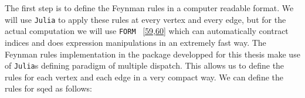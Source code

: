 \documentclass[
  11pt,
  a4paper,
  DIV=11,
  numbers=noendperiod,
  twoside]{scrreprt}
\newenvironment{Shaded}{\begin{snugshade}}{\end{snugshade}}
\newcommand{\DataTypeTok}[1]{\textcolor[rgb]{0.68,0.00,0.00}{#1}}
\newcommand{\FunctionTok}[1]{\textcolor[rgb]{0.28,0.35,0.67}{#1}}
\newcommand{\KeywordTok}[1]{\textcolor[rgb]{0.00,0.23,0.31}{#1}}
\newcommand{\NormalTok}[1]{\textcolor[rgb]{0.00,0.23,0.31}{#1}}
\newcommand{\OperatorTok}[1]{\textcolor[rgb]{0.37,0.37,0.37}{#1}}
\newcommand{\PreprocessorTok}[1]{\textcolor[rgb]{0.68,0.00,0.00}{#1}}
\newcommand{\SpecialCharTok}[1]{\textcolor[rgb]{0.37,0.37,0.37}{#1}}
\newcommand{\StringTok}[1]{\textcolor[rgb]{0.13,0.47,0.30}{#1}}
\DeclareRobustCommand{\[}{\begin{equation}}
\DeclareRobustCommand{\]}{\end{equation}}
\begin{document}
The first step is to define the Feynman rules in a computer readable
format. We will use \texttt{Julia} to apply these rules at every vertex
and every edge, but for the actual computation we will use \texttt{FORM}
~{[}\protect\hyperlink{ref-Vermaseren:2000nd}{59},\protect\hyperlink{ref-Kuipers:2012rf}{60}{]}
which can automatically contract indices and does expression
manipulations in an extremely fast way. The Feynman rules implementation
in the package developped for this thesis make use of \texttt{Julia}s
defining paradigm of multiple dispatch. This allows us to define the
rules for each vertex and each edge in a very compact way. We can define
the rules for \gls{sqed} as follows:

\begin{Shaded}
\end{Shaded}
\end{document}
